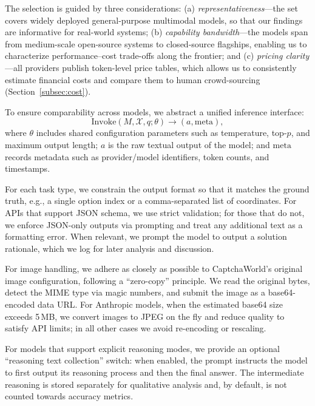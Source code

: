 \documentclass[sigconf, review]{acmart}
\begin{document}
The selection is guided by three considerations: (a) \emph{representativeness}---the set covers widely deployed general-purpose multimodal models, so that our findings are informative for real-world systems; (b) \emph{capability bandwidth}---the models span from medium-scale open-source systems to closed-source flagships, enabling us to characterize performance--cost trade-offs along the frontier; and (c) \emph{pricing clarity}---all providers publish token-level price tables, which allows us to consistently estimate financial costs and compare them to human crowd-sourcing (Section~\ref{subsec:cost}).

To ensure comparability across models, we abstract a unified inference interface:
\begin{equation}
  \mathrm{Invoke}(M, \mathcal{X}, q; \theta) \rightarrow (a, \mathrm{meta}),
\end{equation}
where $\theta$ includes shared configuration parameters such as temperature, top-$p$, and maximum output length; $a$ is the raw textual output of the model; and $\mathrm{meta}$ records metadata such as provider/model identifiers, token counts, and timestamps.

For each task type, we constrain the output format so that it matches the ground truth, e.g., a single option index or a comma-separated list of coordinates. For APIs that support JSON schema, we use strict validation; for those that do not, we enforce JSON-only outputs via prompting and treat any additional text as a formatting error. When relevant, we prompt the model to output a solution rationale, which we log for later analysis and discussion.

For image handling, we adhere as closely as possible to CaptchaWorld's original image configuration, following a ``zero-copy'' principle. We read the original bytes, detect the MIME type via magic numbers, and submit the image as a base64-encoded data URL. For Anthropic models, when the estimated base64 size exceeds 5\,MB, we convert images to JPEG on the fly and reduce quality to satisfy API limits; in all other cases we avoid re-encoding or rescaling.

For models that support explicit reasoning modes, we provide an optional ``reasoning text collection'' switch: when enabled, the prompt instructs the model to first output its reasoning process and then the final answer. The intermediate reasoning is stored separately for qualitative analysis and, by default, is not counted towards accuracy metrics.
\end{document}
